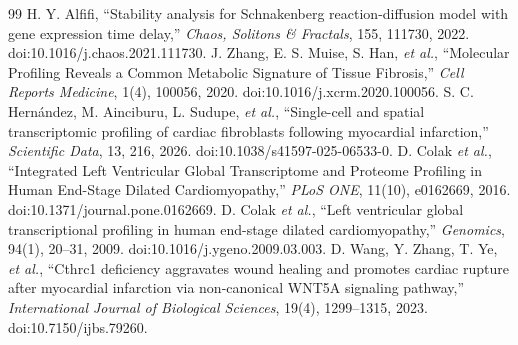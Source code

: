 \documentclass[11pt]{article}
\begin{document}
\renewcommand{\refname}{References used in Supplement}
\begin{thebibliography}{99}
 H. Y. Alfifi, ``Stability analysis for Schnakenberg reaction-diffusion model with gene expression time delay,'' \emph{Chaos, Solitons \& Fractals}, 155, 111730, 2022. doi:10.1016/j.chaos.2021.111730.
 J. Zhang, E. S. Muise, S. Han, \emph{et al.}, ``Molecular Profiling Reveals a Common Metabolic Signature of Tissue Fibrosis,'' \emph{Cell Reports Medicine}, 1(4), 100056, 2020. doi:10.1016/j.xcrm.2020.100056.
 S. C. Hern\'andez, M. Ainciburu, L. Sudupe, \emph{et al.}, ``Single-cell and spatial transcriptomic profiling of cardiac fibroblasts following myocardial infarction,'' \emph{Scientific Data}, 13, 216, 2026. doi:10.1038/s41597-025-06533-0.
 D. Colak \emph{et al.}, ``Integrated Left Ventricular Global Transcriptome and Proteome Profiling in Human End-Stage Dilated Cardiomyopathy,'' \emph{PLoS ONE}, 11(10), e0162669, 2016. doi:10.1371/journal.pone.0162669.
 D. Colak \emph{et al.}, ``Left ventricular global transcriptional profiling in human end-stage dilated cardiomyopathy,'' \emph{Genomics}, 94(1), 20--31, 2009. doi:10.1016/j.ygeno.2009.03.003.
 D. Wang, Y. Zhang, T. Ye, \emph{et al.}, ``Cthrc1 deficiency aggravates wound healing and promotes cardiac rupture after myocardial infarction via non-canonical WNT5A signaling pathway,'' \emph{International Journal of Biological Sciences}, 19(4), 1299--1315, 2023. doi:10.7150/ijbs.79260.
\end{thebibliography}
\end{document}
